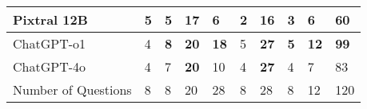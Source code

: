 \begin{table*}[]
\begin{tabular}{|l|l|l|l|l|l|l|l|l|l|}
Pixtral 12B                                                              & \textbf{5}                                                                & 5                 & 17                                                                       & 6                                                                       & 2                                                                            & 16                                                                      & 3                 & 6                                                                    & 60             \\ \hline
ChatGPT-o1                                                               & 4                                                                         & \textbf{8}        & \textbf{20}                                                              & \textbf{18}                                                             & 5                                                                            & \textbf{27}                                                             & \textbf{5}        & \textbf{12}                                                          & \textbf{99}    \\ \hline
ChatGPT-4o                                                               & 4                                                                         & 7                 & \textbf{20}                                                              & 10                                                                      & 4                                                                            & \textbf{27}                                                             & 4                 & 7                                                                    & 83             \\ \hline
Number of Questions                                                      & 8                                                                         & 8                 & 20                                                                       & 28                                                                      & 8                                                                            & 28                                                                      & 8                 & 12                                                                   & 120            \\ \hline
\end{tabular}
\label{tab:answer_score}
\end{table*}


